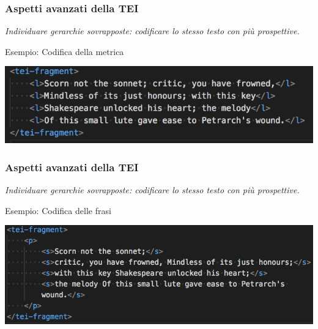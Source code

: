     \begin{frame}
        \frametitle{Aspetti avanzati della TEI}
        \addtocounter{nframe}{1}
        
    \textit{Individuare gerarchie sovrapposte: codificare lo stesso testo con più prospettive.}

        \begin{block}{Esempio: Codifica della metrica}
            \begin{center}
                \includegraphics[width=.95\textwidth]{imgs/metrica.png}
            \end{center}
        \end{block}
        
    \end{frame}

    \begin{frame}
        \frametitle{Aspetti avanzati della TEI}
        \addtocounter{nframe}{1}
        
    \textit{Individuare gerarchie sovrapposte: codificare lo stesso testo con più prospettive.}

        \begin{block}{Esempio: Codifica delle frasi}
            \begin{center}
                \includegraphics[width=.95\textwidth]{imgs/frasi.png}
            \end{center}
        \end{block}
        
    \end{frame}


